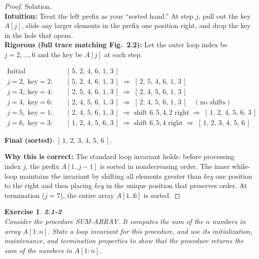 \documentclass[12pt]{article}
\newtheorem{exercise}[theorem]{Exercise}
\theoremstyle{definition}
\begin{document}
\begin{proof}
Solution.\\

\noindent
\textbf{Intuition:} Treat the left prefix as your “sorted hand.” At step $j$, pull out the key $A[j]$,
slide any larger elements in the prefix one position right, and drop the key in the hole that opens.\\

\noindent
\textbf{Rigorous (full trace matching Fig.\ 2.2):}
Let the outer loop index be $j=2,\dots,6$ and the key be $A[j]$ at each step.

\begin{align*}
\text{Initial} \quad & [\,5,\,2,\,4,\,6,\,1,\,3\,] \\
j=2,\; \text{key}=2:\quad & [\,\underline{5},\,\boxed{2},\,4,\,6,\,1,\,3\,] \;\Rightarrow\; [\,2,\,5,\,4,\,6,\,1,\,3\,] \\
j=3,\; \text{key}=4:\quad & [\,2,\,\underline{5},\,\boxed{4},\,6,\,1,\,3\,] \;\Rightarrow\; [\,2,\,4,\,5,\,6,\,1,\,3\,] \\
j=4,\; \text{key}=6:\quad & [\,2,\,4,\,5,\,\boxed{6},\,1,\,3\,] \;\Rightarrow\; [\,2,\,4,\,5,\,6,\,1,\,3\,] \quad (\text{no shifts})\\
j=5,\; \text{key}=1:\quad & [\,2,\,4,\,5,\,6,\,\boxed{1},\,3\,]
   \;\Rightarrow\; \text{shift }6,5,4,2 \text{ right}
   \;\Rightarrow\; [\,1,\,2,\,4,\,5,\,6,\,3\,] \\
j=6,\; \text{key}=3:\quad & [\,1,\,2,\,4,\,5,\,6,\,\boxed{3}\,]
   \;\Rightarrow\; \text{shift }6,5,4 \text{ right}
   \;\Rightarrow\; [\,1,\,2,\,\boxed{3},\,4,\,5,\,6\,]
\end{align*}

\noindent
\textbf{Final (sorted)}:\; $[\,1,\,2,\,3,\,4,\,5,\,6\,]$.

\smallskip
\noindent
\textbf{Why this is correct:} The standard loop invariant holds:
before processing index $j$, the prefix $A[1..j-1]$ is sorted in nondecreasing order.
The inner while-loop maintains the invariant by shifting all elements greater than \textit{key}
one position to the right and then placing \textit{key} in the unique position that preserves order.
At termination ($j=7$), the entire array $A[1..6]$ is sorted.
\end{proof}

\newpage

\begin{exercise}
\noindent
\textbf{2.1-2}\\
\noindent
Consider the procedure SUM-ARRAY. It computes the sum of the $n$ numbers in array $A[1:n]$.
State a loop invariant for this procedure, and use its initialization, maintenance, and termination
properties to show that the procedure returns the sum of the numbers in $A[1:n]$.
\end{exercise}
\end{document}
